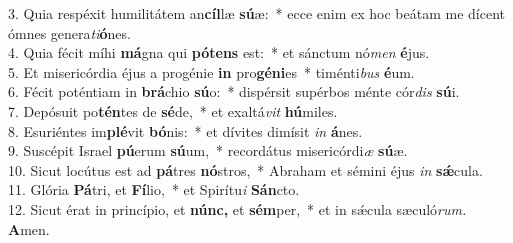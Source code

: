 3. Quia respéxit humilitátem an\textbf{cíl}læ \textbf{sú}æ: * ecce enim ex hoc beátam me dícent ómnes genera\textit{ti}\textbf{ó}nes.\\
4. Quia fécit míhi \textbf{má}gna qui \textbf{pótens} est: * et sánctum nó\textit{men} \textbf{é}jus.\\
5. Et misericórdia éjus a progénie \textbf{in} pro\textbf{géni}es * timénti\textit{bus}  \textbf{é}um.\\
6. Fécit poténtiam in \textbf{brá}chio \textbf{sú}o: * dispérsit supérbos ménte cór\textit{dis} \textbf{sú}i.\\
7. Depósuit po\textbf{tén}tes de \textbf{sé}de, * et exaltá\textit{vit} \textbf{hú}miles.\\
8. Esuriéntes im\textbf{plé}vit \textbf{bó}nis: * et dívites dimísit \textit{in} \textbf{á}nes.\\
9. Suscépit Israel \textbf{pú}erum \textbf{sú}um, * recordátus misericórdi\textit{æ} \textbf{sú}æ.\\
10. Sicut locútus est ad \textbf{pá}tres \textbf{nó}stros, * Abraham et sémini éjus \textit{in} \textbf{sǽ}cula.\\
11. Glória \textbf{Pá}tri, et \textbf{Fí}lio, * et Spirítu\textit{i} \textbf{Sán}cto.\\
12. Sicut érat in princípio, et \textbf{núnc,} et \textbf{sém}per, * et in sǽcula sæculó\textit{rum.} \textbf{A}men.